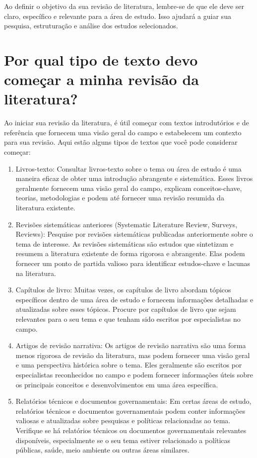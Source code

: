 \documentclass[12pt,a4paper, brazil]{article}
\begin{document}
Ao definir o objetivo da sua revisão de literatura, lembre-se de que ele deve ser claro, específico e relevante para a área de estudo. Isso ajudará a guiar sua pesquisa, estruturação e análise dos estudos selecionados.

\section{Por qual tipo de texto devo começar a minha revisão da literatura?}

Ao iniciar sua revisão da literatura, é útil começar com textos introdutórios e de referência que fornecem uma visão geral do campo e estabelecem um contexto para sua revisão. Aqui estão alguns tipos de textos que você pode considerar começar:

\begin{enumerate}
    \item Livros-texto: Consultar livros-texto sobre o tema ou área de estudo é uma maneira eficaz de obter uma introdução abrangente e sistemática. Esses livros geralmente fornecem uma visão geral do campo, explicam conceitos-chave, teorias, metodologias e podem até fornecer uma revisão resumida da literatura existente.
    \item Revisões sistemáticas anteriores (Systematic Literature Review, Surveys, Reviews): Pesquise por revisões sistemáticas publicadas anteriormente sobre o tema de interesse. As revisões sistemáticas são estudos que sintetizam e resumem a literatura existente de forma rigorosa e abrangente. Elas podem fornecer um ponto de partida valioso para identificar estudos-chave e lacunas na literatura.
    \item Capítulos de livro: Muitas vezes, os capítulos de livro abordam tópicos específicos dentro de uma área de estudo e fornecem informações detalhadas e atualizadas sobre esses tópicos. Procure por capítulos de livro que sejam relevantes para o seu tema e que tenham sido escritos por especialistas no campo.
    \item Artigos de revisão narrativa: Os artigos de revisão narrativa são uma forma menos rigorosa de revisão da literatura, mas podem fornecer uma visão geral e uma perspectiva histórica sobre o tema. Eles geralmente são escritos por especialistas reconhecidos no campo e podem fornecer informações úteis sobre os principais conceitos e desenvolvimentos em uma área específica.
    \item Relatórios técnicos e documentos governamentais: Em certas áreas de estudo, relatórios técnicos e documentos governamentais podem conter informações valiosas e atualizadas sobre pesquisas e políticas relacionadas ao tema. Verifique se há relatórios técnicos ou documentos governamentais relevantes disponíveis, especialmente se o seu tema estiver relacionado a políticas públicas, saúde, meio ambiente ou outras áreas similares.
\end{enumerate}
\end{document}

